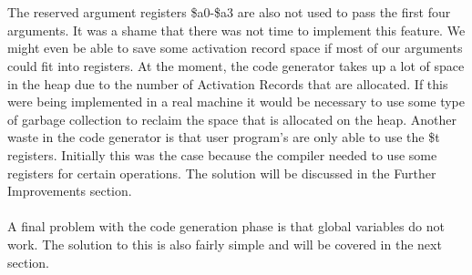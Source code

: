 \ \\ \ \\
The reserved argument registers \$a0-\$a3 are also not used to pass the first four arguments. It was a shame that there was not time to implement this feature. We might even be able to save some activation record space if most of our arguments could fit into registers. At the moment, the code generator takes up a lot of space in the heap due to the number of Activation Records that are allocated. If this were being implemented in a real machine it would be necessary to use some type of garbage collection to reclaim the space that is allocated on the heap. Another waste in the code generator is that user program's are only able to use the \$t registers. Initially this was the case because the compiler needed to use some registers for certain operations. The solution will be discussed in the Further Improvements section.
\ \\ \ \\
A final problem with the code generation phase is that global variables do not work. The solution to this is also fairly simple and will be covered in the next section.
